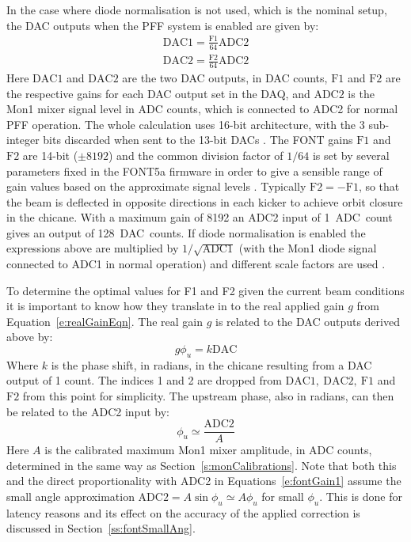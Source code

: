 In the case where diode normalisation is not used, which is the nominal setup, the DAC outputs when the PFF system is enabled are given by:
\begin{eqnarray}
\mathrm{DAC1} = \frac{\mathrm{F1}}{64}\mathrm{ADC2} \nonumber \\ 
\mathrm{DAC2} = \frac{\mathrm{F2}}{64}\mathrm{ADC2} \label{e:fontGain1}
\end{eqnarray}
Here \(\mathrm{DAC1}\) and \(\mathrm{DAC2}\) are the two DAC outputs, in DAC counts, \(\mathrm{F1}\) and \(\mathrm{F2}\) are the respective gains for each DAC output set in the DAQ, and \(\mathrm{ADC2}\) is the Mon1 mixer signal level in ADC counts, which is connected to ADC2 for normal PFF operation. The whole calculation uses 16-bit architecture, with the 3 sub-integer bits discarded when sent to the 13-bit DACs \cite{glennPriv}. The FONT gains \(\mathrm{F1}\) and \(\mathrm{F2}\) are 14-bit (\(\pm8192\)) and the common division factor of \(1/64\) is set by several parameters fixed in the FONT5a firmware in order to give a sensible range of gain values based on the approximate signal levels \cite{glennPriv}. Typically \(\mathrm{F2} = -\mathrm{F1}\), so that the beam is deflected in opposite directions in each kicker to achieve orbit closure in the chicane. With a maximum gain of 8192 an ADC2 input of 1~ADC~count gives an output of 128~DAC~counts. If diode normalisation is enabled the expressions above are multiplied by \(1/\sqrt{\mathrm{ADC1}}\) (with the Mon1 diode signal connected to ADC1 in normal operation) and different scale factors are used \cite{glennPriv}.

To determine the optimal values for F1 and F2 given the current beam conditions it is important to know how they translate in to the real applied gain \(g\) from Equation~\ref{e:realGainEqn}. The real gain \(g\) is related to the DAC outputs derived above by:
\begin{equation} \label{e:fontGain2}
g\phi_u = k\mathrm{DAC}
\end{equation}
Where \(k\) is the phase shift, in radians, in the chicane resulting from a DAC output of 1 count. The indices 1 and 2 are dropped from \(\mathrm{DAC1,~DAC2,~F1}\) and \(\mathrm{F2}\) from this point for simplicity. The upstream phase, also in radians, can then be related to the ADC2 input by:
\begin{equation} \label{e:fontGain3}
\phi_u \simeq \frac{\mathrm{ADC2}}{A}
\end{equation}
Here \(A\) is the calibrated maximum Mon1 mixer amplitude, in ADC counts, determined in the same way as Section~\ref{s:monCalibrations}. Note that both this and the direct proportionality with ADC2 in Equations~\ref{e:fontGain1} assume the small angle approximation \(\mathrm{ADC2} = A\sin\phi_u \simeq A\phi_u\) for small \(\phi_u\). This is done for latency reasons \cite{glennPriv} and its effect on the accuracy of the applied correction is discussed in Section~\ref{ss:fontSmallAng}.

